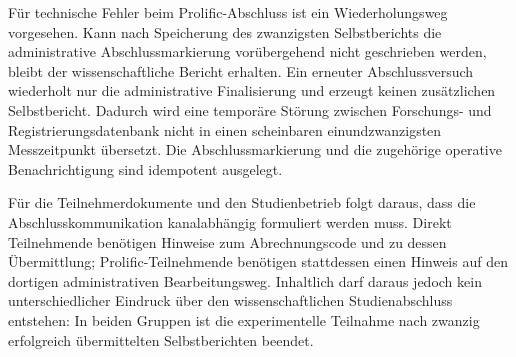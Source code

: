 \begin{neu}
Für technische Fehler beim Prolific-Abschluss ist ein Wiederholungsweg vorgesehen. Kann nach Speicherung des zwanzigsten Selbstberichts die administrative Abschlussmarkierung vorübergehend nicht geschrieben werden, bleibt der wissenschaftliche Bericht erhalten. Ein erneuter Abschlussversuch wiederholt nur die administrative Finalisierung und erzeugt keinen zusätzlichen Selbstbericht. Dadurch wird eine temporäre Störung zwischen Forschungs- und Registrierungsdatenbank nicht in einen scheinbaren einundzwanzigsten Messzeitpunkt übersetzt. Die Abschlussmarkierung und die zugehörige operative Benachrichtigung sind idempotent ausgelegt.

Für die Teilnehmerdokumente und den Studienbetrieb folgt daraus, dass die Abschlusskommunikation kanalabhängig formuliert werden muss. Direkt Teilnehmende benötigen Hinweise zum Abrechnungscode und zu dessen Übermittlung; Prolific-Teilnehmende benötigen stattdessen einen Hinweis auf den dortigen administrativen Bearbeitungsweg. Inhaltlich darf daraus jedoch kein unterschiedlicher Eindruck über den wissenschaftlichen Studienabschluss entstehen: In beiden Gruppen ist die experimentelle Teilnahme nach zwanzig erfolgreich übermittelten Selbstberichten beendet.
\end{neu}
